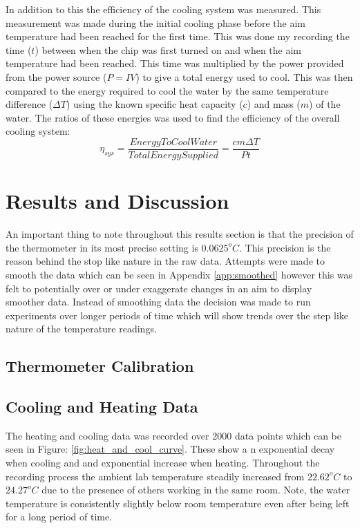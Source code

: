 \documentclass[10pt]{article}
\begin{document}
In addition to this the efficiency of the cooling system was measured. This measurement was made during the initial cooling phase before the aim temperature had been reached for the first time. This was done my recording the time ($t$) between when the chip was first turned on and when the aim temperature had been reached. This time was multiplied by the power provided from the power source ($P=IV$) to give a total energy used to cool. This was then compared to the energy required to cool the water by the same temperature difference ($\Delta T$) using the known specific heat capacity ($c$) and mass ($m$) of the water. The ratios of these energies was used to find the efficiency of the overall cooling system:
\begin{equation}
    \eta_{sys} = \frac{EnergyToCoolWater}{TotalEnergySupplied} = \frac{cm\Delta T}{Pt}
\end{equation}


\section*{Results and Discussion}
An important thing to note throughout this results section is that the precision of the thermometer in its most precise setting is $0.0625^oC$. This precision is the reason behind the stop like nature in the raw data. Attempts were made to smooth the data which can be seen in Appendix \ref{app:smoothed} however this was felt to potentially over or under exaggerate changes in an aim to display smoother data. Instead of smoothing data the decision was made to run experiments over longer periods of time which will show trends over the step like nature of the temperature readings. \\

\subsection*{Thermometer Calibration}
\subsection*{Cooling and Heating Data}
The heating and cooling data was recorded over 2000 data points which can be seen in Figure: \ref{fig:heat_and_cool_curve}. These show a n exponential decay when cooling and and exponential increase when heating. Throughout the recording process the ambient lab temperature steadily increased from $22.62^oC$ to $24.27^oC$ due to the presence of others working in the same room. Note, the water temperature is consistently slightly below room temperature even after being left for a long period of time.\\
\end{document}
